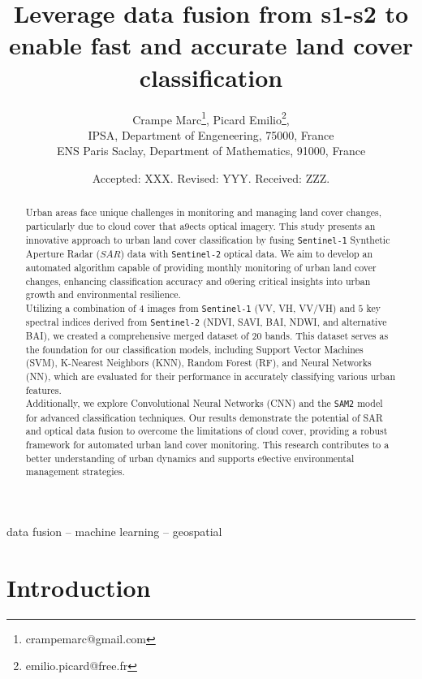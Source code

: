 \documentclass[usenatbib]{tjaa}
\title[Short Title max 45 chars]{Leverage data fusion from s1-s2 to enable\newline  
fast and accurate land cover classification}
\author[F. Author \others]{%
Crampe Marc\autid{1}{0000-0000-0000-0000}\thanks{crampemarc@gmail.com},
Picard Emilio\autid{2}{0000-0000-0000-0000}\thanks{emilio.picard@free.fr},
\\
\adrid{1}IPSA, Department of Engeneering, 75000, France\\
\adrid{2}ENS Paris Saclay, Department of Mathematics, 91000, France\\
}%
\date{Accepted: XXX. Revised: YYY. Received: ZZZ.}
\begin{document}
\label{firstpage}
\pagerange{\pageref{firstpage}--\pageref{lastpage}}

\begin{abstract}
  Urban areas face unique challenges in monitoring and managing land cover changes,
  particularly due to cloud cover that a9ects optical imagery. This study presents an innovative
  approach to urban land cover classification by fusing \texttt{Sentinel-1} Synthetic Aperture Radar ($SAR$)
  data with \texttt{Sentinel-2} optical data. We aim to develop an automated algorithm capable of
  providing monthly monitoring of urban land cover changes, enhancing classification accuracy
  and o9ering critical insights into urban growth and environmental resilience.
  \\
  Utilizing a combination of $4$ images from \texttt{Sentinel-1} (VV, VH, VV/VH) and $5$ key spectral indices
  derived from \texttt{Sentinel-2} (NDVI, SAVI, BAI, NDWI, and alternative BAI), we created a
  comprehensive merged dataset of $20$ bands. This dataset serves as the foundation for our
  classification models, including Support Vector Machines (SVM), K-Nearest Neighbors (KNN),
  Random Forest (RF), and Neural Networks (NN), which are evaluated for their performance in
  accurately classifying various urban features.
  \\
  Additionally, we explore Convolutional Neural Networks (CNN) and the \texttt{SAM2} model for
  advanced classification techniques. Our results demonstrate the potential of SAR and optical
  data fusion to overcome the limitations of cloud cover, providing a robust framework for
  automated urban land cover monitoring. This research contributes to a better understanding of
  urban dynamics and supports e9ective environmental management strategies. \cite{einstein1905}
\end{abstract}

\begin{keywords}
data fusion -- machine learning -- geospatial
\end{keywords}

\section{Introduction}
\end{document}
